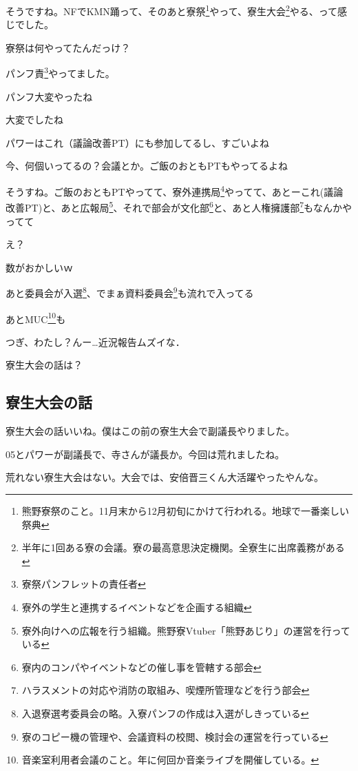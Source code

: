 \begin{multicols}{2}
そうですね。NFでKMN踊って、そのあと寮祭\footnote{熊野寮祭のこと。11月末から12月初旬にかけて行われる。地球で一番楽しい祭典}やって、寮生大会\footnote{半年に1回ある寮の会議。寮の最高意思決定機関。全寮生に出席義務がある}やる、って感じでした。

寮祭は何やってたんだっけ？

パンフ責\footnote{寮祭パンフレットの責任者}やってました。

パンフ大変やったね

大変でしたね

パワーはこれ（議論改善PT）にも参加してるし、すごいよね

今、何個いってるの？会議とか。ご飯のおともPTもやってるよね

そうすね。ご飯のおともPTやってて、寮外連携局\footnote{寮外の学生と連携するイベントなどを企画する組織}やってて、あとーこれ(議論改善PT)と、あと広報局\footnote{寮外向けへの広報を行う組織。熊野寮Vtuber「熊野あじり」の運営を行っている}、それで部会が文化部\footnote{寮内のコンパやイベントなどの催し事を管轄する部会}と、あと人権擁護部\footnote{ハラスメントの対応や消防の取組み、喫煙所管理などを行う部会}もなんかやってて

え？

数がおかしいｗ

あと委員会が入選\footnote{入退寮選考委員会の略。入寮パンフの作成は入選がしきっている}、でまぁ資料委員会\footnote{寮のコピー機の管理や、会議資料の校閲、検討会の運営を行っている}も流れで入ってる

あとMUC\footnote{音楽室利用者会議のこと。年に何回か音楽ライブを開催している。}も

つぎ、わたし？んー…近況報告ムズイな．

寮生大会の話は？

\subsection{寮生大会の話}

寮生大会の話いいね。僕はこの前の寮生大会で副議長やりました。

05とパワーが副議長で、寺さんが議長か。今回は荒れましたね。

荒れない寮生大会はない。大会では、安倍晋三くん大活躍やったやんな。


\end{multicols}
